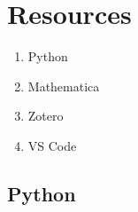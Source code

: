 \chapter{Resources}

\begin{enumerate}
    \item Python
    \item Mathematica
    \item Zotero
    \item VS Code
\end{enumerate}

\section{Python}
